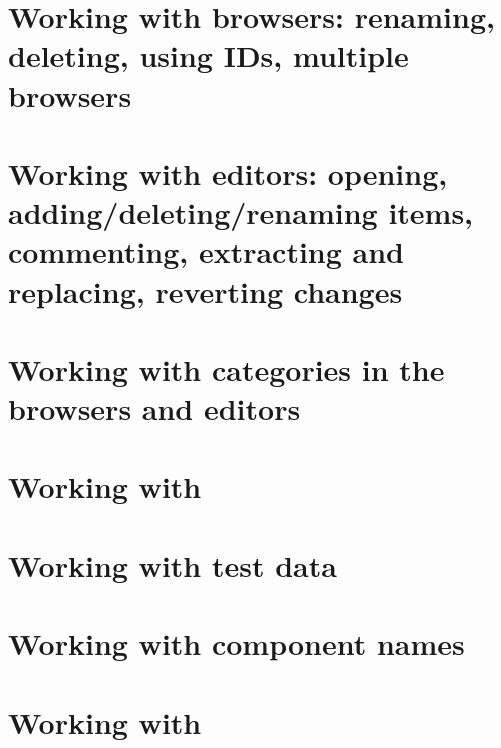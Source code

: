 \section{Working with browsers: renaming, deleting, using IDs, multiple browsers}
\label{WorkingWithBrowsers}


\section{Working with editors: opening, adding/deleting/renaming items, commenting, extracting and replacing, reverting changes}
\label{WorkingWithEditors}


\section{Working with categories in the browsers and editors}
\label{WorkingWithCategories}


\clearpage
\section{Working with \gdcases{}}
\label{WorkingWithTestCases}


\clearpage

\section{Working with test data}
\label{WorkingWithData}


\clearpage

\section{Working with component names}
\label{reass}



\clearpage

\section{Working with \gdsuites{}}
\label{WorkingWithSuites}


